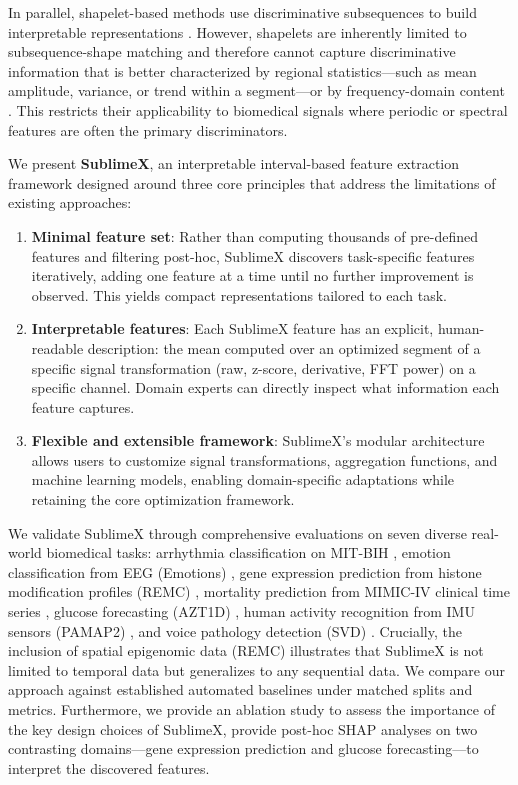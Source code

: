 \documentclass[times, review, 10pt]{elsarticle}
\begin{document}
In parallel, shapelet-based methods use discriminative subsequences to build interpretable representations \cite{ye2009shapelets, hills2014shapelet,
grabocka2014learning}. However, shapelets are inherently limited to subsequence-shape matching and therefore cannot capture discriminative
information that is better characterized by regional statistics---such as mean amplitude, variance, or trend within a segment---or by frequency-domain
content \cite{middlehurst2024bakeoff}. This restricts their applicability to biomedical signals where periodic or spectral features are often the primary discriminators.

We present \textbf{SublimeX}, an interpretable interval-based feature extraction framework designed around three core principles that address the limitations of existing approaches:

\begin{enumerate}
\item \textbf{Minimal feature set}: Rather than computing thousands of pre-defined features and
filtering post-hoc, SublimeX discovers task-specific features iteratively, adding one feature
at a time until no further improvement is observed. This yields compact representations tailored to each task.

\item \textbf{Interpretable features}: Each SublimeX feature has an explicit,
human-readable description: the mean computed over an optimized segment of a
specific signal transformation (raw, z-score, derivative, FFT power) on a
specific channel. Domain experts can directly inspect what information each feature captures.

\item \textbf{Flexible and extensible framework}: SublimeX's modular architecture allows users
to customize signal transformations, aggregation functions, and machine learning models,
enabling domain-specific adaptations while retaining the core optimization framework.
\end{enumerate}

We validate SublimeX through comprehensive evaluations on seven diverse real-world biomedical
tasks: arrhythmia classification on MIT-BIH \cite{MoodyMark1992,Goldberger2000}, emotion
classification from EEG (Emotions) \cite{bird2018study}, gene expression prediction from
histone modification profiles (REMC) \cite{Roadmap2015}, mortality prediction from MIMIC-IV
clinical time series \cite{Johnson2023MIMICIV}, glucose forecasting (AZT1D)
\cite{khamesian2025azt1d}, human activity recognition from IMU sensors (PAMAP2)
\cite{Reiss2012PAMAP2}, and voice pathology detection (SVD) \cite{svd_database}. Crucially,
the inclusion of spatial epigenomic data (REMC) illustrates that SublimeX is not limited to temporal data but generalizes to any sequential data. 
We compare our approach against established automated baselines under matched splits and metrics.
Furthermore, we provide an ablation study to assess the
importance of the key design choices of SublimeX, provide
post-hoc SHAP analyses on two contrasting domains---gene
expression prediction and glucose forecasting---to
interpret the discovered features.
\end{document}
